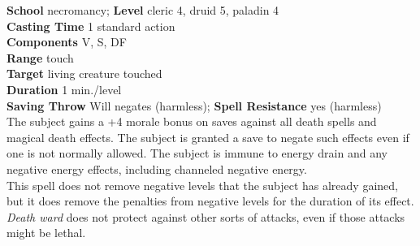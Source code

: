 \textbf{School }necromancy; \textbf{Level }cleric 4, druid 5, paladin 4\\
\textbf{Casting Time }1 standard action\\
\textbf{Components }V, S, DF\\
\textbf{Range }touch\\
\textbf{Target }living creature touched\\
\textbf{Duration }1 min./level\\
\textbf{Saving Throw} Will negates (harmless); \textbf{Spell Resistance} yes (harmless)\\
The subject gains a +4 morale bonus on saves against all death spells and magical death effects. The subject is granted a save to negate such effects even if one is not normally allowed. The subject is immune to energy drain and any negative energy effects, including channeled negative energy.\\
This spell does not remove negative levels that the subject has already gained, but it does remove the penalties from negative levels for the duration of its effect.\\
\textit{Death ward }does not protect against other sorts of attacks, even if those attacks might be lethal.\\
